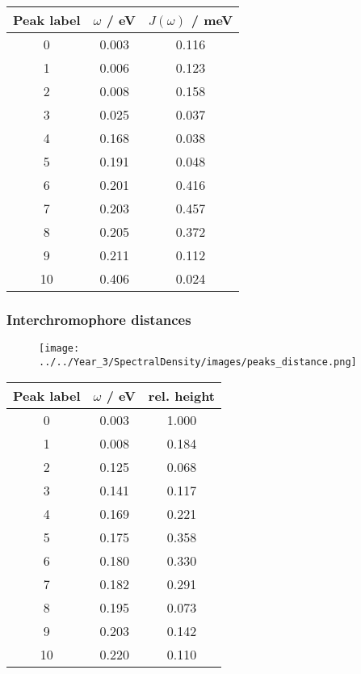 \begin{table}
    \centering
    \begin{tabular}{||c c c||}
    \hline
    Peak label & $\omega$ / eV & $J\left(\omega\right)$ / meV \\
    \hline\hline
    
     0 & 0.003 & 0.116 \\
     1 & 0.006 & 0.123 \\
     2 & 0.008 & 0.158 \\
     3 & 0.025 & 0.037 \\
     4 & 0.168 & 0.038 \\
     5 & 0.191 & 0.048 \\
     6 & 0.201 & 0.416 \\
     7 & 0.203 & 0.457 \\
     8 & 0.205 & 0.372 \\
     9 & 0.211 & 0.112 \\
     10 & 0.406 & 0.024 \\
    \hline 
    \end{tabular}
    \end{table}

\afterpartskip
\subsubsection{Interchromophore distances}
\label{subsubsec:specdens_distances}

\begin{figure}
    \centering
    \texttt{[image: ../../Year\_3/SpectralDensity/images/peaks\_distance.png]}
\end{figure}


\begin{table}
    \centering
    \begin{tabular}{||c c c||}
    \hline
    Peak label & $\omega$ / eV & rel. height \\
    \hline\hline
    
     0 & 0.003 & 1.000 \\
     1 & 0.008 & 0.184 \\
     2 & 0.125 & 0.068 \\
     3 & 0.141 & 0.117 \\
     4 & 0.169 & 0.221 \\
     5 & 0.175 & 0.358 \\
     6 & 0.180 & 0.330 \\
     7 & 0.182 & 0.291 \\
     8 & 0.195 & 0.073 \\
     9 & 0.203 & 0.142 \\
     10 & 0.220 & 0.110 \\
    \hline 
    \end{tabular}
\end{table}

